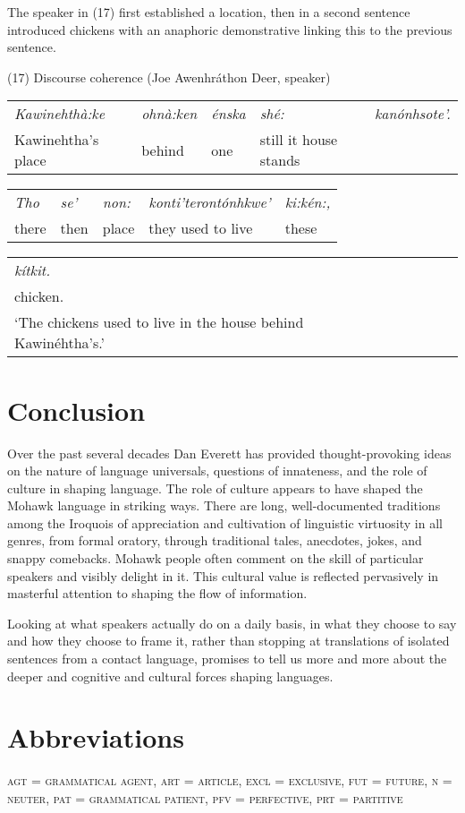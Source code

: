 \documentclass[output=paper,colorlinks,citecolor=brown
]{langscibook}
\begin{document}
The speaker in (17) first established a location, then in a second sentence introduced chickens with an anaphoric demonstrative linking this to the previous sentence.\bigskip


(17) Discourse coherence (Joe Awenhráthon Deer, speaker)\\

\begin{tabular}{lllll}
\emph{Kawinehthà:ke} & \emph{ohnà:ken} & \emph{énska} & \emph{shé:} &\emph{kanónhsote'.}\\

Kawinehtha's place & behind & one & still it house stands
\end{tabular}\bigskip

\begin{tabular}{lllll}
\emph{Tho} & \emph{se'} & \emph{non:} & \emph{konti'terontónhkwe'} & \emph{ki:kén:,}\\

there & then & place & they used to live & these
\end{tabular}\bigskip

\begin{tabular}{lllll}
\emph{kítkit.}\\

chicken.\\

`The chickens used to live in the house behind Kawinéhtha's.'
\end{tabular}\bigskip


\section{Conclusion}

Over the past several decades Dan Everett has provided thought-provoking ideas on the nature of language universals, questions of innateness, and the role of culture in shaping language. The role of culture appears to have shaped the Mohawk language in striking ways. There are long, well-documented traditions among the Iroquois of appreciation and cultivation of linguistic virtuosity in all genres, from formal oratory, through traditional tales, anecdotes, jokes, and snappy comebacks. Mohawk people often comment on the skill of particular speakers and visibly delight in it. This cultural value is reflected pervasively in masterful attention to shaping the flow of information.

Looking at what speakers actually do on a daily basis, in what they choose to say and how they choose to frame it, rather than stopping at translations of isolated sentences from a contact language, promises to tell us more and more about the deeper and cognitive and cultural forces shaping languages.

\section*{Abbreviations}

\textsc{agt = grammatical agent, art = article, excl = exclusive, fut =
future, n = neuter, pat = grammatical patient, pfv = perfective, prt =
partitive}

\printbibliography[heading=subbibliography,notkeyword=this]

\sloppy
\end{document}
